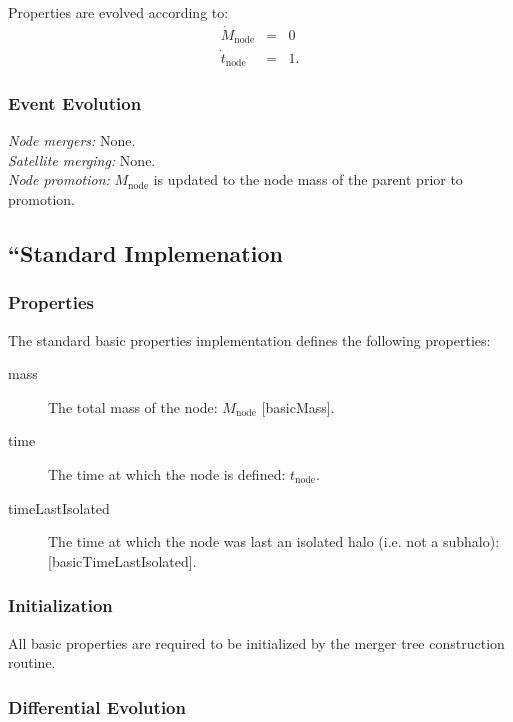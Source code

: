 Properties are evolved according to:
\begin{eqnarray}
 \dot{M}_\mathrm{node} &=& 0 \\
 \dot{t}_\mathrm{node} &=& 1.
\end{eqnarray}

\subsubsection{Event Evolution}

\noindent\emph{Node mergers:} None.\\

\noindent\emph{Satellite merging:} None.\\

\noindent\emph{Node promotion:} $M_\mathrm{node}$ is updated to the \gls{node} mass of the parent prior to promotion.\\

\subsection{``Standard Implemenation}

\subsubsection{Properties}

The standard basic properties implementation defines the following properties:
\begin{description}
 \item [{\normalfont \ttfamily mass}] The total mass of the node: $M_\mathrm{node}$ [{\normalfont \ttfamily basicMass}].
 \item [{\normalfont \ttfamily time}] The time at which the \gls{node} is defined: $t_\mathrm{node}$.
 \item [{\normalfont \ttfamily timeLastIsolated}] The time at which the \gls{node} was last an isolated halo (i.e. not a subhalo): [\normalfont \ttfamily basicTimeLastIsolated].
\end{description}

\subsubsection{Initialization}

All basic properties are required to be initialized by the merger tree construction routine.

\subsubsection{Differential Evolution}

